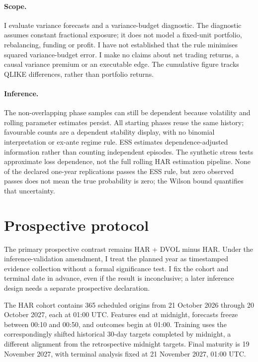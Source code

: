 \documentclass[10pt,a4paper]{article}
\newcommand{\HorizonDays}{30}
\newcommand{\PlannedOrigins}{365}
\newcommand{\HARStartDate}{21 October 2026}
\newcommand{\HAREndDate}{20 October 2027}
\newcommand{\HAROriginTime}{01:00}
\newcommand{\HARFreezeStartTime}{00:10}
\newcommand{\HARFreezeEndTime}{00:50}
\newcommand{\HARMaturityDate}{19 November 2027}
\newcommand{\HARAnalysisDate}{21 November 2027}
\begin{document}
\paragraph{Scope.} I evaluate variance forecasts and a variance-budget diagnostic. The diagnostic assumes constant fractional exposure; it does not model a fixed-unit portfolio, rebalancing, funding or profit. I have not established that the rule minimises squared variance-budget error. I make no claims about net trading returns, a causal variance premium or an executable edge. The cumulative figure tracks QLIKE differences, rather than portfolio returns.

\paragraph{Inference.} The non-overlapping phase samples can still be dependent because volatility and rolling parameter estimates persist. All starting phases reuse the same history; favourable counts are a dependent stability display, with no binomial interpretation or ex-ante regime rule. ESS estimates dependence-adjusted information rather than counting independent episodes. The synthetic stress tests approximate loss dependence, not the full rolling HAR estimation pipeline. None of the declared one-year replications passes the ESS rule, but zero observed passes does not mean the true probability is zero; the Wilson bound quantifies that uncertainty.

\section{Prospective protocol}

The primary prospective contrast remains HAR + DVOL minus HAR. Under the inference-validation amendment, I treat the planned year as timestamped evidence collection without a formal significance test. I fix the cohort and terminal date in advance, even if the result is inconclusive; a later inference design needs a separate prospective declaration.

The HAR cohort contains \PlannedOrigins{} scheduled origins from \HARStartDate{} through \HAREndDate{}, each at \HAROriginTime{} UTC. Features end at midnight, forecasts freeze between \HARFreezeStartTime{} and \HARFreezeEndTime{}, and outcomes begin at \HAROriginTime{}. Training uses the correspondingly shifted historical \HorizonDays{}-day targets completed by midnight, a different alignment from the retrospective midnight targets. Final maturity is \HARMaturityDate{}, with terminal analysis fixed at \HARAnalysisDate{}, \HAROriginTime{} UTC.
\end{document}
